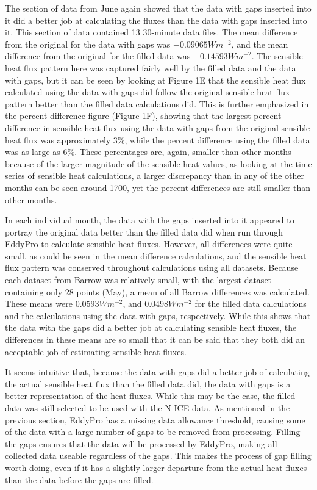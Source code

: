 The section of data from June again showed that the data with gaps inserted into it did a better job at calculating the fluxes than the data with gaps inserted into it. This section of data contained 13 30-minute data files. The mean difference from the original for the data with gaps was $-0.09065 Wm^{-2}$, and the mean difference from the original for the filled data was $-0.14593 Wm^{-2}$. The sensible heat flux pattern here was captured fairly well by the filled data and the data with gaps, but it can be seen by looking at Figure 1E that the sensible heat flux calculated using the data with gaps did follow the original sensible heat flux pattern better than the filled data calculations did. This is further emphasized in the percent difference figure (Figure 1F), showing that the largest percent difference in sensible heat flux using the data with gaps from the original sensible heat flux was approximately $3\%$, while the percent difference using the filled data was as large as $6\%$. These percentages are, again, smaller than other months because of the larger magnitude of the sensible heat values, as looking at the time series of sensible heat calculations, a larger discrepancy than in any of the other months can be seen around 1700, yet the percent differences are still smaller than other months.

In each individual month, the data with the gaps inserted into it appeared to portray the original data better than the filled data did when run through EddyPro to calculate sensible heat fluxes. However, all differences were quite small, as could be seen in the mean difference calculations, and the sensible heat flux pattern was conserved throughout calculations using all datasets. Because each dataset from Barrow was relatively small, with the largest dataset containing only 28 points (May), a mean of all Barrow differences was calculated. These means were $0.0593 Wm^{-2}$, and $0.0498 Wm^{-2}$ for the filled data calculations and the calculations using the data with gaps, respectively. While this shows that the data with the gaps did a better job at calculating sensible heat fluxes, the differences in these means are so small that it can be said that they both did an acceptable job of estimating sensible heat fluxes. 

It seems intuitive that, because the data with gaps did a better job of calculating the actual sensible heat flux than the filled data did, the data with gaps is a better representation of the heat fluxes. While this may be the case, the filled data was still selected to be used with the N-ICE data. As mentioned in the previous section, EddyPro has a missing data allowance threshold, causing some of the data with a large number of gaps to be removed from processing. Filling the gaps ensures that the data will be processed by EddyPro, making all collected data useable regardless of the gaps. This makes the process of gap filling worth doing, even if it has a slightly larger departure from the actual heat fluxes than the data before the gaps are filled. 

